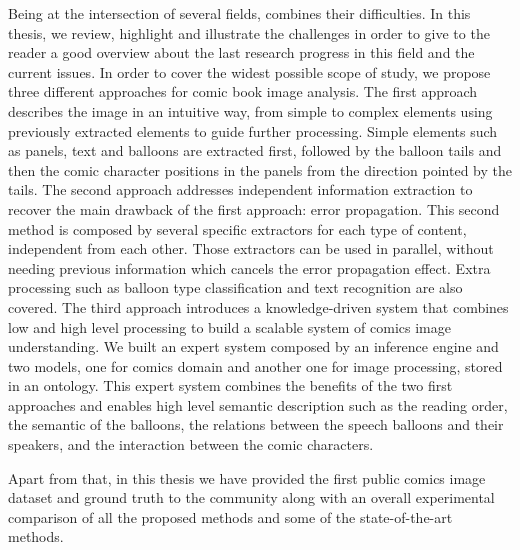 Being at the intersection of several fields, combines their difficulties.
In this thesis, we review, highlight and illustrate the challenges in order to give to the reader a good overview about the last research progress in this field and the current issues.
In order to cover the widest possible scope of study, we propose three different approaches for comic book image analysis.
The first approach describes the image in an intuitive way, from simple to complex elements using previously extracted elements to guide further processing.
Simple elements such as panels, text and balloons are extracted first, followed by the balloon tails and then the comic character positions in the panels from the direction pointed by the tails.
The second approach addresses independent information extraction to recover the main drawback of the first approach: error propagation.
This second method is composed by several specific extractors for each type of content, independent from each other.
Those extractors can be used in parallel, without needing previous information which cancels the error propagation effect.
Extra processing such as balloon type classification and text recognition are also covered.
The third approach introduces a knowledge-driven system that combines low and high level processing to build a scalable system of comics image understanding.
We built an expert system composed by an inference engine and two models, one for comics domain and another one for image processing, stored in an ontology.
This expert system combines the benefits of the two first approaches and enables high level semantic description such as the reading order, the semantic of the balloons, the relations between the speech balloons and their speakers, and the interaction between the comic characters.

Apart from that, in this thesis we have provided the first public comics image dataset and ground truth to the community along with an overall experimental comparison of all the proposed methods and some of the state-of-the-art methods.



